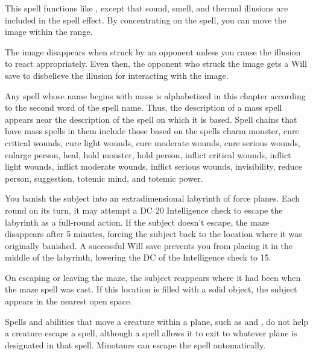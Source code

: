 \begin{spelleffect}
  This spell functions like , except that sound, smell, and thermal illusions are included in the spell effect. By concentrating on the spell, you can move the image within the range.
\end{spelleffect}
\begin{spellnotes}
  The image disappears when struck by an opponent unless you cause the illusion to react appropriately. Even then, the opponent who struck the image gets a Will save to disbelieve the illusion for interacting with the image.
\end{spellnotes}

\par Any spell whose name begins with mass is alphabetized in this chapter according to the second word of the spell name. Thus, the description of a mass spell appears near the description of the spell on which it is based. Spell chains that have mass spells in them include those based on the spells charm monster, cure critical wounds, cure light wounds, cure moderate wounds, cure serious wounds, enlarge person, heal, hold monster, hold person, inflict critical wounds, inflict light wounds, inflict moderate wounds, inflict serious wounds, invisibility, reduce person, suggestion, totemic mind, and totemic power.

\spellrng{\rngclose}
\begin{spelleffect}
  You banish the subject into an extradimensional labyrinth of force planes. Each round on its turn, it may attempt a DC 20 Intelligence check to escape the labyrinth as a full-round action. If the subject doesn't escape, the maze disappears after 5 minutes, forcing the subject back to the location where it was originally banished. A successful Will save prevents you from placing it in the middle of the labyrinth, lowering the DC of the Intelligence check to 15.
  \par On escaping or leaving the maze, the subject reappears where it had been when the maze spell was cast. If this location is filled with a solid object, the subject appears in the nearest open space.
\end{spelleffect}
\begin{spellnotes}
  Spells and abilities that move a creature within a plane, such as  and , do not help a creature escape a  spell, although a  spell allows it to exit to whatever plane is designated in that spell. Minotaurs can escape the spell automatically.
\end{spellnotes}

